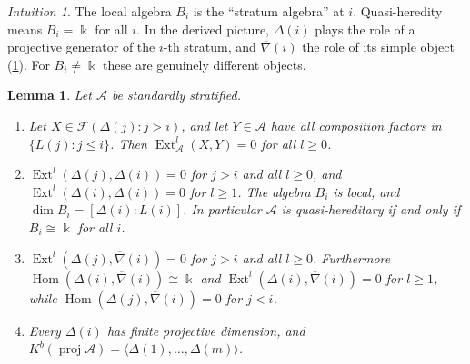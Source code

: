 \documentclass[11pt,reqno]{amsart}
\theoremstyle{plain}
\newtheorem{lemma}[theorem]{Lemma}
\theoremstyle{definition}
\theoremstyle{remark}
\newtheorem*{intuition}{Intuition}
\newcommand{\kk}{\Bbbk}
\DeclareMathOperator{\Hom}{Hom}
\DeclareMathOperator{\Ext}{Ext}
\newcommand{\proj}{\operatorname{proj}}
\newcommand{\Kb}{K^b}
\newcommand{\thick}[1]{\langle #1\rangle}
\newcommand{\nablabar}{\overline{\nabla}}
\newcommand{\cA}{\mathcal{A}}
\newcommand{\cF}{\mathcal{F}}
\begin{document}
\begin{intuition}
The local algebra $B_i$ is the ``stratum algebra'' at $i$. Quasi-heredity means $B_i=\kk$ for all $i$. In the derived picture, $\Delta(i)$ plays the role of a projective generator of the $i$-th stratum, and $\nablabar(i)$ the role of its simple object (\cref{lem:strat-basic}). For $B_i\ne\kk$ these are genuinely different objects.
\end{intuition}

\begin{lemma}\label{lem:strat-basic}
Let $\cA$ be standardly stratified.
\begin{enumerate}
\item Let $X\in\cF(\Delta(j):j>i)$, and let $Y\in\cA$ have all composition factors in $\{L(j):j\le i\}$. Then $\Ext^l_\cA(X,Y)=0$ for all $l\ge0$.
\item $\Ext^l(\Delta(j),\Delta(i))=0$ for $j>i$ and all $l\ge0$, and $\Ext^l(\Delta(i),\Delta(i))=0$ for $l\ge1$. The algebra $B_i$ is local, and $\dim B_i=[\Delta(i):L(i)]$. In particular $\cA$ is quasi-hereditary if and only if $B_i\cong\kk$ for all $i$.
\item $\Ext^l(\Delta(j),\nablabar(i))=0$ for $j>i$ and all $l\ge0$. Furthermore $\Hom(\Delta(i),\nablabar(i))\cong\kk$ and $\Ext^l(\Delta(i),\nablabar(i))=0$ for $l\ge1$, while $\Hom(\Delta(j),\nablabar(i))=0$ for $j<i$.
\item Every $\Delta(i)$ has finite projective dimension, and $\Kb(\proj\cA)=\thick{\Delta(1),\dots,\Delta(m)}$.
\end{enumerate}
\end{lemma}
\end{document}
